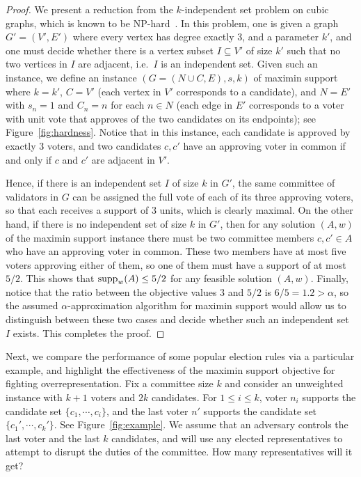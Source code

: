 \begin{proof}
We present a reduction from the $k$-independent set problem on cubic graphs, which is known to be NP-hard~\cite{johnson1979computers}. In this problem, one is given a graph $G'=(V',E')$ where every vertex has degree exactly 3, and a parameter $k'$, and one must decide whether there is a vertex subset $I\subseteq V'$ of size $k'$ such that no two vertices in $I$ are adjacent, i.e.~$I$ is an independent set. 
Given such an instance, we define an instance $(G=(N\cup C, E), s, k)$ of maximin support where $k=k'$, $C=V'$ (each vertex in $V'$ corresponds to a candidate), and $N=E'$ with $s_n=1$ and $C_n=n$ for each $n\in N$ (each edge in $E'$ corresponds to a voter with unit vote that approves of the two candidates on its endpoints); see Figure~\ref{fig:hardness}.
Notice that in this instance, each candidate is approved by exactly 3 voters, and two candidates $c, c'$ have an approving voter in common if and only if $c$ and $c'$ are adjacent in $V'$.

Hence, if there is an independent set $I$ of size $k$ in $G'$, the same committee of validators in $G$ can be assigned the full vote of each of its three approving voters, so that each receives a support of 3 units, which is clearly maximal. On the other hand, if there is no independent set of size $k$ in $G'$, then for any solution $(A,w)$ of the maximin support instance there must be two committee members $c,c'\in A$ who have an approving voter in common. These two members have at most five voters approving either of them, so one of them must have a support of at most $5/2$. This shows that $\operatorname{supp}_w(A)\leq 5/2$ for any feasible solution $(A,w)$. Finally, notice that the ratio between the objective values $3$ and $5/2$ is $6/5=1.2>\alpha$, so the assumed $\alpha$-approximation algorithm for maximin support would allow us to distinguish between these two cases and decide whether such an independent set $I$ exists. This completes the proof.
\end{proof}

Next, we compare the performance of some popular election rules via a particular example, and highlight the effectiveness of the maximin support objective for fighting overrepresentation. 
Fix a committee size $k$ and consider an unweighted instance with $k+1$ voters and $2k$ candidates. 
For $1\leq i\leq k$, voter $n_i$ supports the candidate set $\{c_1, \cdots, c_i\}$, and the last voter $n'$ supports the candidate set $\{c_1', \cdots, c_k'\}$. See Figure~\ref{fig:example}.
%
We assume that an adversary controls the last voter and the last $k$ candidates, and will use any elected representatives to attempt to disrupt the duties of the committee. 
How many representatives will it get? 

